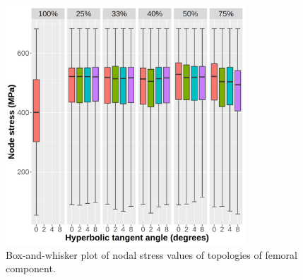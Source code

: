 \documentclass[../main.tex]{subfiles}
\begin{document}
\begin{figure}[h!]
  \centering
  \includegraphics[width=0.8\textwidth]{images/results/plots/femoral/stress/boxplots.png}
  \caption{Box-and-whisker plot of nodal stress values of topologies of femoral component.}
  \label{fig:stress_boxwhisker}
\end{figure}
\end{document}
